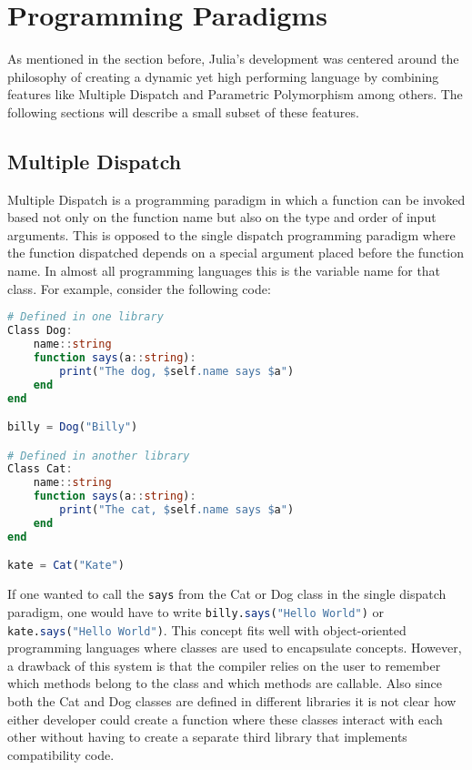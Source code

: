 \setcounter{chapter}{2}
\setcounter{section}{0}
\setcounter{subsection}{0}
\chapter*{Programming Paradigms}
As mentioned in the section before, Julia's development was centered around the philosophy of creating a dynamic yet high
performing language by combining features like Multiple Dispatch and Parametric Polymorphism among others. The following
sections will describe a small subset of these features.

\section{Multiple Dispatch}
Multiple Dispatch is a programming paradigm in which a function can be invoked based not only on the function name but
also on the type and order of input arguments. This is opposed to the single dispatch programming paradigm where the
function dispatched depends on a special argument placed before the function name. In almost all programming languages
this is the variable name for that class. For example, consider the following code: \hfill
\begin{lstlisting}[language=Julia]
# Defined in one library
Class Dog:
    name::string
    function says(a::string):
        print("The dog, $self.name says $a")
    end
end

billy = Dog("Billy")

# Defined in another library
Class Cat:
    name::string
    function says(a::string):
        print("The cat, $self.name says $a")
    end
end

kate = Cat("Kate")
\end{lstlisting}
If one wanted to call the \lstinline[language=Julia]{says} from the Cat or Dog class in the single dispatch paradigm,
one would have to write \lstinline[language=Julia]{billy.says("Hello World")} or
\lstinline[language=Julia]{kate.says("Hello World")}. This concept fits well with object-oriented programming languages
where classes are used to encapsulate concepts. However, a drawback of this system is that the compiler relies on the
user to remember which methods belong to the class and which methods are callable. Also since both the Cat and Dog
classes are defined in different libraries it is not clear how either developer could create a function where these
classes interact with each other without having to create a separate third library that implements compatibility code.


